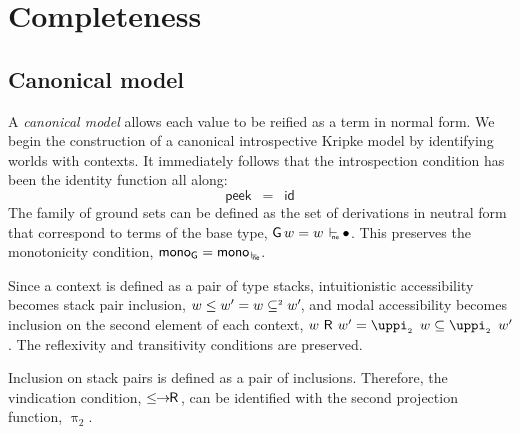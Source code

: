 \documentclass[submission,copyright,creativecommons,sharealike,backref=page]{eptcs}
\renewcommand{\leq}{\mathrel{\subseteq}}
\newcommand{\leqII}{\mathrel{\subseteq^{\scriptscriptstyle{2}}}}
\newcommand{\R}{\mathrel{\rlap{$\mkern.75mu\textsf{R}$}\hphantom{\subseteq}}}
\renewcommand{\:}{\mathop{\mkern3mu:\mkern3mu}}
\renewcommand{\.}{\mathop{\mkern3mu.\mkern3mu}}
\renewcommand{\;}{\mathop{;}}
\renewcommand{\,}{\mathop{,}}
\newcommand{\id}{\operatorname{\textsf{id}}}
\newcommand{\ene}{\mathrel{\mkern2mu\vdash_{\mkern-9mu\rlap{$\scriptscriptstyle{\textsf{ne}}$}\hphantom{\scriptscriptstyle{\textsf{nf}}}}}}
\renewcommand{\r}{\mathrel{\rightarrow\mkern-1mu}}
\newcommand{\monoene}{\operatorname{\textsf{mono}_{\ene}}}
\newcommand{\peek}{\operatorname{\textsf{peek}}}
\newcommand{\piii}{\operatorname{\uppi_{\scriptscriptstyle{2}}}}
\newcommand{\lerR}{\operatorname{\le\mkern-1mu\r\mkern-1mu\R}}
\newcommand{\G}{\operatorname{\textsf{G}}}
\newcommand{\monoG}{\operatorname{\textsf{mono}_{\G}}}
\newcommand{\base}{\mathop{\bullet}}
\theoremstyle{mystyle}
\begin{document}
\section{Completeness}\label{Completeness}

\subsection{Canonical model}

A \emph{canonical model} allows each value to be reified as a term in normal form.  We begin the construction of a canonical introspective Kripke model by identifying worlds with contexts.  It immediately follows that the introspection condition has been the identity function all along:
$$
\peek ~=~ \id
$$
The family of ground sets can be defined as the set of derivations in neutral form that correspond to terms of the base type, $\G w = w \ene \base$.  This preserves the monotonicity condition, $\monoG = \monoene$.

Since a context is defined as a pair of type stacks, intuitionistic accessibility becomes stack pair inclusion, $w \le w' = w \leqII w'\mkern-3mu$, and modal accessibility becomes inclusion on the second element of each context, $w \R w' = \piii~w \leq \piii~w'\mkern-3mu$.  The reflexivity and transitivity conditions are preserved.

Inclusion on stack pairs is defined as a pair of inclusions.  Therefore, the vindication condition, $\lerR$, can be identified with the second projection function, $\piii$.
\end{document}
